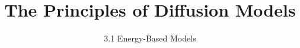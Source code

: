 ﻿%

\graphicspath{{../images/}}
\title{The Principles of Diffusion Models}
\subtitle{3.1 Energy-Based Models}


\begin{frame}
    \titlepage
\end{frame}


